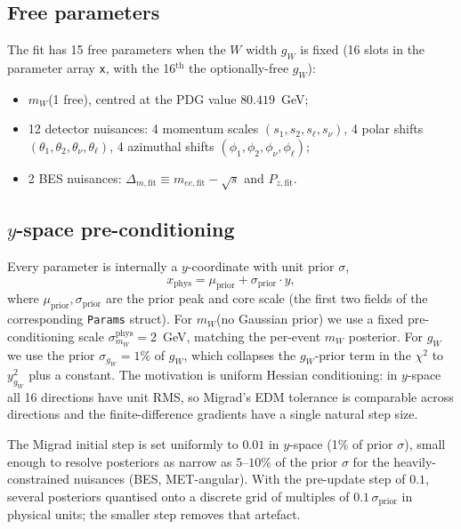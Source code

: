 \documentclass[11pt,a4paper]{article}
\newcommand{\sqs}{\ensuremath{\sqrt{s}}\xspace}
\newcommand{\mW}{\ensuremath{m_W}\xspace}
\newcommand{\codename}[1]{\texttt{\small #1}}
\newcommand{\chisq}{\ensuremath{\chi^2}\xspace}
\begin{document}
\subsection{Free parameters}\label{sec:params}

The fit has 15 free parameters when the $W$ width $g_W$ is fixed
(16 slots in the parameter array \codename{x}, with the 16$^\text{th}$
the optionally-free $g_W$):
\begin{itemize}[leftmargin=*]
  \item \mW (1 free), centred at the PDG value $80.419$~GeV;
  \item 12 detector nuisances: 4 momentum scales
        $(s_1,s_2,s_\ell,s_\nu)$, 4 polar shifts
        $(\theta_1,\theta_2,\theta_\nu,\theta_\ell)$, 4 azimuthal
        shifts $(\phi_1,\phi_2,\phi_\nu,\phi_\ell)$;
  \item 2 BES nuisances:
        $\Delta_{m,\text{fit}}\equiv m_{ee,\text{fit}}-\sqs$ and
        $P_{z,\text{fit}}$.
\end{itemize}

\subsection{$y$-space pre-conditioning}\label{sec:y-rescale}

Every parameter is internally a $y$-coordinate with unit prior $\sigma$,
\[
x_\text{phys} = \mu_\text{prior} + \sigma_\text{prior}\cdot y,
\]
where $\mu_\text{prior},\sigma_\text{prior}$ are the prior peak and
core scale (the first two fields of the corresponding
\codename{*Params} struct). For \mW (no Gaussian prior) we use a fixed
pre-conditioning scale $\sigma_{\mW}^\text{phys} = 2$~GeV, matching the
per-event \mW posterior. For $g_W$ we use the prior
$\sigma_{g_W} = 1\%$ of $g_W$, which collapses the $g_W$-prior term in
the \chisq to $y_{g_W}^2$ plus a constant. The motivation is uniform
Hessian conditioning: in $y$-space all 16 directions have unit RMS, so
Migrad's EDM tolerance is comparable across directions and the
finite-difference gradients have a single natural step size.

The Migrad initial step is set uniformly to $0.01$ in $y$-space (1\% of
prior $\sigma$), small enough to resolve posteriors as narrow as
$5$--$10\%$ of the prior $\sigma$ for the heavily-constrained nuisances
(BES, MET-angular). With the pre-update step of $0.1$, several
posteriors quantised onto a discrete grid of multiples of
$0.1\,\sigma_\text{prior}$ in physical units; the smaller step removes
that artefact.
\end{document}
